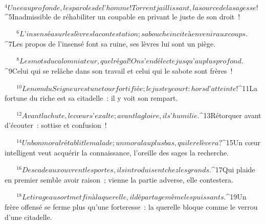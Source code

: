            
         
${}^{4}Une eau profonde, les paroles de l’homme !
        Torrent jaillissant, la source de la sagesse !
        
           
         
${}^{5}Inadmissible de réhabiliter un coupable
        en privant le juste de son droit !
        
           
         
${}^{6}L’insensé a sur les lèvres la contestation ;
        sa bouche incite à en venir aux coups.
        
           
         
${}^{7}Les propos de l’insensé font sa ruine,
        ses lèvres lui sont un piège.
        
           
         
${}^{8}Les mots du calomniateur, quel régal !
        On s’en délecte jusqu’au plus profond.
        
           
         
${}^{9}Celui qui se relâche dans son travail
        et celui qui le sabote sont frères !
        
           
         
${}^{10}Le nom du Seigneur est une tour fortifiée ;
        le juste y court : hors d’atteinte !
        
           
         
${}^{11}La fortune du riche est sa citadelle :
        il y voit son rempart.
        
           
         
${}^{12}Avant la chute, le cœur s’exalte ;
        avant la gloire, il s’humilie.
        
           
         
${}^{13}Rétorquer avant d’écouter :
        sottise et confusion !
        
           
         
${}^{14}Un bon moral rétablit le malade ;
        un moral au plus bas, qui le relèvera ?
        
           
         
${}^{15}Un cœur intelligent veut acquérir la connaissance,
        l’oreille des sages la recherche.
        
           
         
${}^{16}Des cadeaux ouvrent les portes,
        ils introduisent chez les grands.
        
           
         
${}^{17}Qui plaide en premier semble avoir raison ;
        vienne la partie adverse, elle contestera.
        
           
         
${}^{18}Le tirage au sort met fin à la querelle,
        il départage même les puissants.
        
           
         
${}^{19}Un frère offensé se ferme plus qu’une forteresse :
        la querelle bloque comme le verrou d’une citadelle.
        
